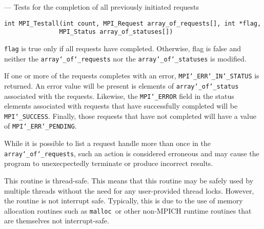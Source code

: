 \startmanpage
{}
--- Tests for the completion of all previously initiated requests 
\startvb\begin{verbatim}
int MPI_Testall(int count, MPI_Request array_of_requests[], int *flag, 
               MPI_Status array_of_statuses[])

\end{verbatim}
\endvb

\par
{}
\par
{}
{\tt flag} is true only if all requests have completed.  Otherwise, flag is
false and neither the {\tt array{\tt \char`\_}of{\tt \char`\_}requests} nor the {\tt array{\tt \char`\_}of{\tt \char`\_}statuses} is
modified.
\par
If one or more of the requests completes with an error, {\tt MPI{\tt \char`\_}ERR{\tt \char`\_}IN{\tt \char`\_}STATUS} is
returned.  An error value will be present is elements of {\tt array{\tt \char`\_}of{\tt \char`\_}status
}associated with the requests.  Likewise, the {\tt MPI{\tt \char`\_}ERROR} field in the status
elements associated with requests that have successfully completed will be
{\tt MPI{\tt \char`\_}SUCCESS}.  Finally, those requests that have not completed will have a
value of {\tt MPI{\tt \char`\_}ERR{\tt \char`\_}PENDING}.
\par
While it is possible to list a request handle more than once in the
{\tt array{\tt \char`\_}of{\tt \char`\_}requests}, such an action is considered erroneous and may cause the
program to unexecpectedly terminate or produce incorrect results.
\par
{}
\par
This routine is thread-safe.  This means that this routine may be
safely used by multiple threads without the need for any user-provided
thread locks.  However, the routine is not interrupt safe.  Typically,
this is due to the use of memory allocation routines such as {\tt malloc
}or other non-MPICH runtime routines that are themselves not interrupt-safe.
